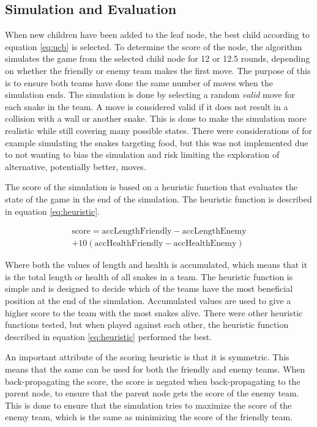 \documentclass[a4paper,12pt]{article}
\begin{document}
\subsection{Simulation and Evaluation}

When new children have been added to the leaf node, the best child according to equation \ref{eq:ucb} is selected. To determine the score of the node, the algorithm simulates the game from the selected child node for 12 or 12.5 rounds, depending on whether the friendly or enemy team makes the first move. The purpose of this is to ensure both teams have done the same number of moves when the simulation ends. The simulation is done by selecting a random \textit{valid} move for each snake in the team. A move is considered valid if it does not result in a collision with a wall or another snake. This is done to make the simulation more realistic while still covering many possible states. There were considerations of for example simulating the snakes targeting food, but this was not implemented due to not wanting to bias the simulation and risk limiting the exploration of alternative, potentially better, moves.


The score of the simulation is based on a heuristic function that evaluates the state of the game in the end of the simulation. The heuristic function is described in equation \ref{eq:heuristic}.


\begin{multline} \label{eq:heuristic}
    \text{score} = \text{accLengthFriendly} - \text{accLengthEnemy}\\ + 10 (\text{accHealthFriendly} - \text{accHealthEnemy})
\end{multline}

Where both the values of length and health is accumulated, which means that it is the total length or health of all snakes in a team. The heuristic function is simple and is designed to decide which of the teams have the most beneficial position at the end of the simulation. Accumulated values are used to give a higher score to the team with the most snakes alive. There were other heuristic functions tested, but when played against each other, the heuristic function described in equation \ref{eq:heuristic} performed the best.

An important attribute of the scoring heuristic is that it is symmetric. This means that the same can be used for both the friendly and enemy teams. When back-propagating the score, the score is negated when back-propagating to the parent node, to ensure that the parent node gets the score of the enemy team. This is done to ensure that the simulation tries to maximize the score of the enemy team, which is the same as minimizing the score of the friendly team.
\end{document}
